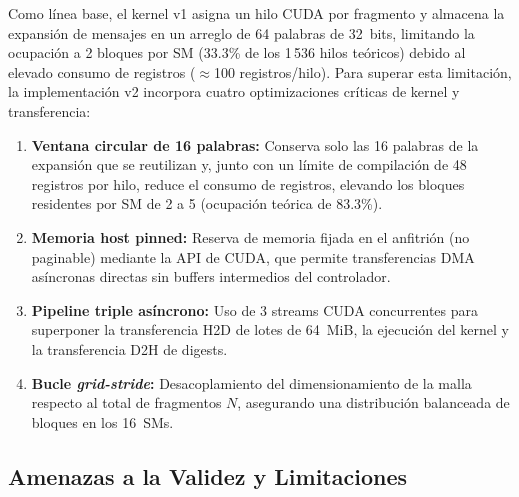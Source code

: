\documentclass[conference]{IEEEtran}
\begin{document}
Como línea base, el kernel v1 asigna un hilo CUDA por fragmento y almacena la expansión de mensajes en un arreglo de 64 palabras de 32~bits, limitando la ocupación a 2 bloques por SM (33.3\% de los 1\,536 hilos teóricos) debido al elevado consumo de registros ($\approx$100 registros/hilo). Para superar esta limitación, la implementación v2 incorpora cuatro optimizaciones críticas de kernel y transferencia:
\begin{enumerate}
    \item \textbf{Ventana circular de 16 palabras:} Conserva solo las 16 palabras de la expansión que se reutilizan y, junto con un límite de compilación de 48 registros por hilo, reduce el consumo de registros, elevando los bloques residentes por SM de 2 a 5 (ocupación teórica de 83.3\%).
    \item \textbf{Memoria host pinned:} Reserva de memoria fijada en el anfitrión (no paginable) mediante la API de CUDA, que permite transferencias DMA asíncronas directas sin buffers intermedios del controlador.
    \item \textbf{Pipeline triple asíncrono:} Uso de 3 streams CUDA concurrentes para superponer la transferencia H2D de lotes de 64~MiB, la ejecución del kernel y la transferencia D2H de digests.
    \item \textbf{Bucle \textit{grid-stride}:} Desacoplamiento del dimensionamiento de la malla respecto al total de fragmentos $N$, asegurando una distribución balanceada de bloques en los 16~SMs.
\end{enumerate}

\subsection{Amenazas a la Validez y Limitaciones}
\end{document}
